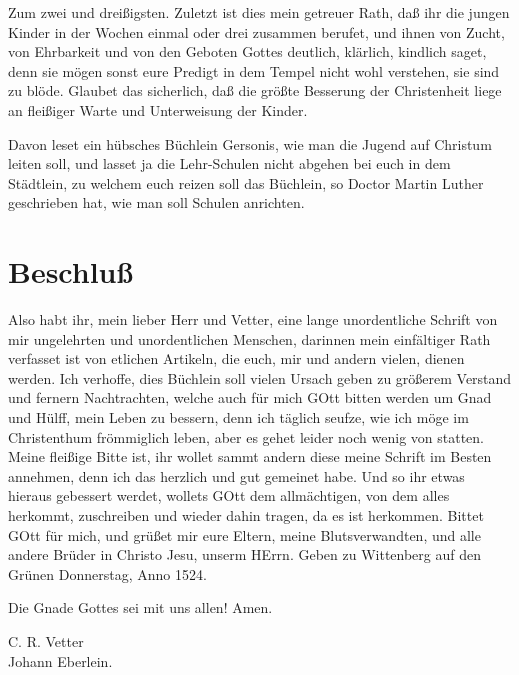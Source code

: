 Zum zwei und dreißigsten. Zuletzt ist dies mein getreuer Rath, daß ihr die jungen Kinder in der Wochen einmal oder drei zusammen berufet, und ihnen von Zucht, von Ehrbarkeit und von den Geboten Gottes deutlich, klärlich, kindlich saget, denn sie mögen sonst eure Predigt in dem Tempel nicht wohl verstehen, sie sind zu blöde. Glaubet das sicherlich, daß die größte Besserung der Christenheit liege an fleißiger Warte und Unterweisung der Kinder.

Davon leset ein hübsches Büchlein Gersonis, wie man die Jugend auf Christum leiten soll, und lasset ja die Lehr-Schulen nicht abgehen bei euch in dem Städtlein, zu welchem euch reizen soll das Büchlein, so Doctor Martin Luther geschrieben hat, wie man soll Schulen anrichten.

\section{Beschluß}

Also habt ihr, mein lieber Herr und Vetter, eine lange unordentliche Schrift von mir ungelehrten und unordentlichen Menschen, darinnen mein einfältiger Rath verfasset ist von etlichen Artikeln, die euch, mir und andern vielen, dienen werden. Ich verhoffe, dies Büchlein soll vielen Ursach geben zu größerem Verstand und fernern Nachtrachten, welche auch für mich GOtt bitten werden
um Gnad und Hülff, mein Leben zu bessern, denn ich täglich seufze, wie ich möge im Christenthum frömmiglich leben, aber es gehet leider noch wenig von statten. Meine fleißige Bitte ist, ihr wollet sammt andern diese meine Schrift im Besten annehmen, denn ich das herzlich und gut gemeinet habe. Und so ihr etwas hieraus gebessert werdet, wollets GOtt dem allmächtigen, von dem alles herkommt, zuschreiben und wieder dahin tragen, da es ist herkommen. Bittet GOtt für mich, und grüßet mir eure Eltern, meine Blutsverwandten, und alle andere Brüder in Christo Jesu, unserm HErrn. Geben zu Wittenberg auf den Grünen Donnerstag, Anno 1524.

Die Gnade Gottes sei mit uns allen! Amen.

\begin{unterschrift}
C. R. Vetter\\
Johann Eberlein.
\end{unterschrift}

\begin{titelseite}
\\[1ex]
\\[2ex]
\end{titelseite}

